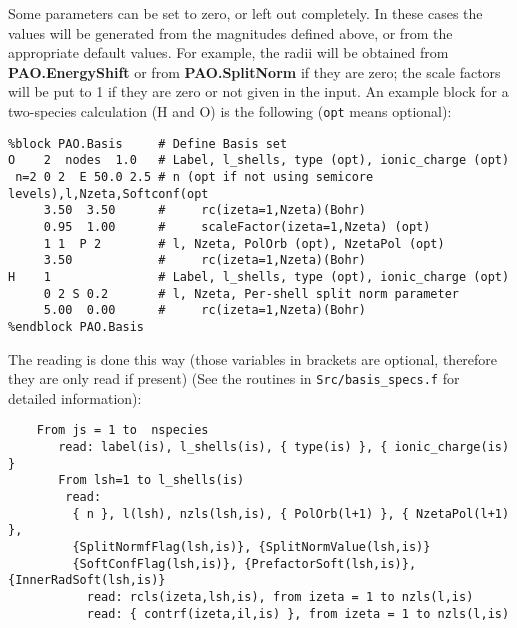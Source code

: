 \documentclass[11pt]{article}
\begin{document}
\begin{description}
Some parameters can be set to zero, or
left out completely.  In these cases the values will be generated from the
magnitudes defined above, or from the appropriate default values. For
example, the radii will be obtained from {\bf
PAO.EnergyShift} or from {\bf PAO.SplitNorm} if they are zero; the
scale factors will be put to 1 if they are zero or not given in the
input.  An example block for a two-species calculation (H and O) is
the following ({\tt opt} means optional):

\begin{verbatim}
%block PAO.Basis     # Define Basis set
O    2  nodes  1.0   # Label, l_shells, type (opt), ionic_charge (opt)
 n=2 0 2  E 50.0 2.5 # n (opt if not using semicore levels),l,Nzeta,Softconf(opt
     3.50  3.50      #     rc(izeta=1,Nzeta)(Bohr)
     0.95  1.00      #     scaleFactor(izeta=1,Nzeta) (opt)
     1 1  P 2        # l, Nzeta, PolOrb (opt), NzetaPol (opt)
     3.50            #     rc(izeta=1,Nzeta)(Bohr)
H    1               # Label, l_shells, type (opt), ionic_charge (opt)
     0 2 S 0.2       # l, Nzeta, Per-shell split norm parameter
     5.00  0.00      #     rc(izeta=1,Nzeta)(Bohr)
%endblock PAO.Basis
\end{verbatim}

\noindent
The reading is done this way (those variables in brackets are
optional, therefore they are only read if present) (See 
the routines in {\tt Src/basis\_specs.f} for detailed information):

\begin{verbatim}
    From js = 1 to  nspecies 
       read: label(is), l_shells(is), { type(is) }, { ionic_charge(is) }
       From lsh=1 to l_shells(is)
        read: 
         { n }, l(lsh), nzls(lsh,is), { PolOrb(l+1) }, { NzetaPol(l+1) },
         {SplitNormfFlag(lsh,is)}, {SplitNormValue(lsh,is)}
         {SoftConfFlag(lsh,is)}, {PrefactorSoft(lsh,is)}, {InnerRadSoft(lsh,is)}
           read: rcls(izeta,lsh,is), from izeta = 1 to nzls(l,is)
           read: { contrf(izeta,il,is) }, from izeta = 1 to nzls(l,is)
\end{verbatim}


\end{description}
\end{document}
